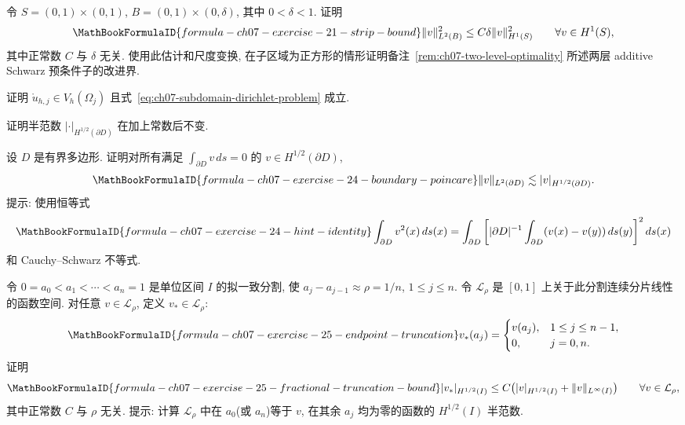 \begin{MBExercise}
\label{exr:ch07-21}
令 $S=(0,1)\times(0,1)$, $B=(0,1)\times(0,\delta)$, 其中 $0<\delta<1$. 证明
\[
\MathBookFormulaID{formula-ch07-exercise-21-strip-bound}
\|v\|_{L^2(B)}^2\leq C\delta\|v\|_{H^1(S)}^2
\qquad\forall v\in H^1(S),
\]
其中正常数 $C$ 与 $\delta$ 无关. 使用此估计和尺度变换, 在子区域为正方形的情形证明备注~\ref{rem:ch07-two-level-optimality} 所述两层 additive Schwarz 预条件子的改进界.
\end{MBExercise}

\begin{MBExercise}
\label{exr:ch07-22}
证明 $\mathring u_{h,j}\in V_h(\Omega_j)$ 且式~\eqref{eq:ch07-subdomain-dirichlet-problem} 成立.
\end{MBExercise}

\begin{MBExercise}
\label{exr:ch07-23}
证明半范数 $|\cdot|_{H^{1/2}(\partial D)}$ 在加上常数后不变.
\end{MBExercise}

\begin{MBExercise}
\label{exr:ch07-24}
设 $D$ 是有界多边形. 证明对所有满足 $\int_{\partial D}v\,ds=0$ 的 $v\in H^{1/2}(\partial D)$,
\[
\MathBookFormulaID{formula-ch07-exercise-24-boundary-poincare}
\|v\|_{L^2(\partial D)}\lesssim|v|_{H^{1/2}(\partial D)}.
\]
提示: 使用恒等式
\[
\MathBookFormulaID{formula-ch07-exercise-24-hint-identity}
\int_{\partial D}v^2(x)\,ds(x)
=\int_{\partial D}\left[
|\partial D|^{-1}\int_{\partial D}(v(x)-v(y))\,ds(y)
\right]^2ds(x)
\]
和 Cauchy--Schwarz 不等式.
\end{MBExercise}

\begin{MBExercise}
\label{exr:ch07-25}
令 $0=a_0<a_1<\cdots<a_n=1$ 是单位区间 $I$ 的拟一致分割, 使 $a_j-a_{j-1}\approx\rho=1/n$, $1\leq j\leq n$. 令 $\mathcal L_\rho$ 是 $[0,1]$ 上关于此分割连续分片线性的函数空间. 对任意 $v\in\mathcal L_\rho$, 定义 $v_*\in\mathcal L_\rho$:
\[
\MathBookFormulaID{formula-ch07-exercise-25-endpoint-truncation}
v_*(a_j)=
\begin{cases}
v(a_j),&1\leq j\leq n-1,\\
0,&j=0,n.
\end{cases}
\]
证明
\[
\MathBookFormulaID{formula-ch07-exercise-25-fractional-truncation-bound}
|v_*|_{H^{1/2}(I)}
\leq C\bigl(|v|_{H^{1/2}(I)}+\|v\|_{L^\infty(I)}\bigr)
\qquad\forall v\in\mathcal L_\rho,
\]
其中正常数 $C$ 与 $\rho$ 无关. 提示: 计算 $\mathcal L_\rho$ 中在 $a_0$(或 $a_n$)等于 $v$, 在其余 $a_j$ 均为零的函数的 $H^{1/2}(I)$ 半范数.
\end{MBExercise}

